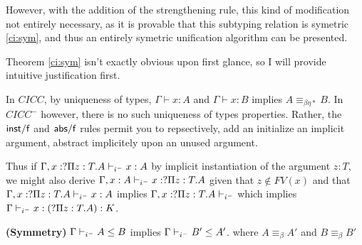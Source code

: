 However, with the addition of the strengthening rule, 
this kind of modification not entirely necessary, 
as it is provable that this subtyping relation is symetric \ref{ci:sym}, 
and thus an entirely symetric unification algorithm can be presented.

Theorem \ref{ci:sym} isn't exactly obvious upon first glance, 
so I will provide intuitive justification first.

In $CICC$, by uniqueness of types, 
$\Gamma \vdash x : A$ and 
$\Gamma \vdash x : B$ implies
$A \equiv_{\beta\eta*} B$.  
In $CICC^{-}$ however, there is no such uniqueness of 
types properties.  
Rather, the $\mathsf{inst/f}$ and $\mathsf{abs/f}$ 
rules permit you to repsectively,
add an initialize an implicit argument, 
abstract implicitely upon an unused argument. 

Thus if $\Gamma , x : ?\Pi z : T . A \vdash_{i^-} x : A$
by implicit instantiation of the argument $z:T$,
we might also
derive
$\Gamma , x : A \vdash_{i^-} x : ?\Pi z : T . A$
given that $z \notin FV(x)$ and that 
$\Gamma , x : ?\Pi z : T . A \vdash_{i^-} x : A$ 
implies $ \Gamma , x : ?\Pi z : T . A \vdash_{i^-}$ 
which implies $ \Gamma\vdash_{i^-} x : (?\Pi z : T . A) : K$.

\begin{theorem}
\textbf{(Symmetry)}
$\Gamma \vdash_{i^-} A \leq B $ implies 
$\Gamma \vdash_{i^-} B' \leq A' $. where $A \equiv_{\beta} A'$ and $B \equiv_{\beta} B'$
\label{ci:sym}
\end{theorem}

